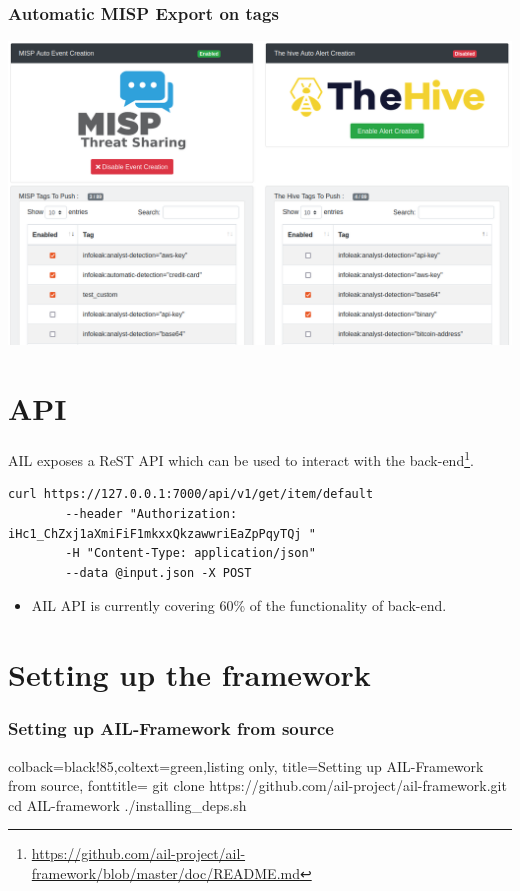 \documentclass{beamer}
\begin{document}
\begin{frame}
    \frametitle{Automatic MISP Export on tags}
    \centerline{\includegraphics[scale=0.25]{screenshot/tags_misp_auto.png}}
\end{frame}


\section{API}

\begin{frame}[fragile]
AIL exposes a ReST API which can be used to interact with the back-end\footnote{\url{https://github.com/ail-project/ail-framework/blob/master/doc/README.md}}.

        \begin{lstlisting}
curl https://127.0.0.1:7000/api/v1/get/item/default
        --header "Authorization: iHc1_ChZxj1aXmiFiF1mkxxQkzawwriEaZpPqyTQj "
        -H "Content-Type: application/json"
        --data @input.json -X POST
        \end{lstlisting}
        \begin{itemize}
                \item AIL API is currently covering 60\% of the functionality of back-end.
        \end{itemize}
\end{frame}

\section{Setting up the framework}
\lstset{style=bash}
\begin{frame}[fragile]
    \frametitle{Setting up AIL-Framework from source}
    \begin{tcblisting}{colback=black!85,coltext=green,listing only,
        title=Setting up AIL-Framework from source, fonttitle=\bfseries}
git clone https://github.com/ail-project/ail-framework.git
cd AIL-framework
./installing_deps.sh
\end{tcblisting}
\end{frame}
\end{document}
